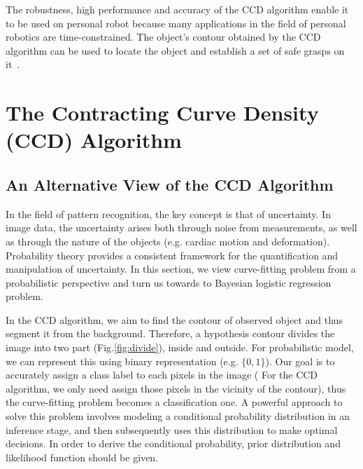 The robustness, high performance and accuracy of the CCD algorithm enable it 
to be used on personal robot  because many applications in the field
of personal robotics are time-constrained. The object's contour
obtained by the CCD algorithm can be used to locate the object and 
establish a set of safe grasps on it~\cite{hanek2000vision}.

\section{The Contracting Curve Density (CCD) Algorithm}
\label{sec:sketch}

\subsection{An Alternative View of the CCD Algorithm}
\label{sec:overview}

In the field of pattern recognition, the key concept is that of
uncertainty. In image data, the uncertainty arises both
through noise from measurements, as well as through the nature of
the objects (e.g. cardiac motion and deformation). Probability theory
provides a consistent framework for the quantification and
manipulation of uncertainty.  In this section, we view curve-fitting
problem from a probabilistic perspective and turn us towards to
Bayesian logistic regression problem.

In the CCD algorithm, we aim to find the contour of observed object
and thus segment it from the background. Therefore, a hypothesis
contour divides the image into two part (Fig.\ref{fig:divide}), inside
and outside. For probabilistic model, we can represent this using
binary representation (e.g. $\{0, 1\}$). Our goal is to accurately
assign a class label to each pixels in the image ( For the CCD
algorithm, we only need assign those pixels in the vicinity of the
contour), thus the curve-fitting problem becomes a classification
one. A powerful approach to solve this problem involves modeling a
conditional probability distribution in an inference stage, and then
subsequently uses this distribution to make optimal decisions. In
order to derive the conditional probability, prior distribution and
likelihood function should be given.

